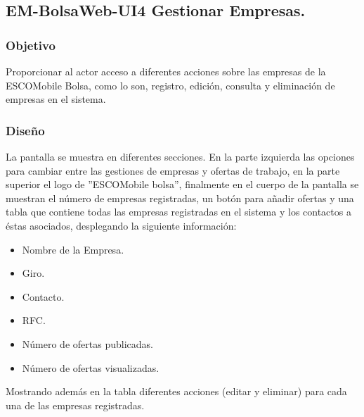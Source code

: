 					



\subsection{EM-BolsaWeb-UI4 Gestionar Empresas.}

\subsubsection{Objetivo}
	\noindent
	Proporcionar al actor acceso a diferentes acciones sobre las empresas de la ESCOMobile Bolsa, como lo son, registro, edición, consulta y eliminación de empresas en el sistema. 

\subsubsection{Diseño}
	\noindent
	La pantalla se muestra en diferentes secciones. En la parte izquierda las opciones para cambiar entre las gestiones de empresas y ofertas de trabajo, en la parte superior el logo de ''ESCOMobile bolsa'', finalmente en el cuerpo de la pantalla se muestran el número de empresas registradas, un botón para añadir ofertas y una tabla que contiene todas las empresas registradas en el sistema y los contactos a éstas asociados, desplegando la siguiente información:
	\begin{itemize}
		\item Nombre de la Empresa.
		\item Giro.
		\item Contacto.
		\item RFC.
		\item Número de ofertas publicadas.
		\item Número de ofertas visualizadas. 
	\end{itemize}
	Mostrando además en la tabla diferentes acciones (editar y eliminar) para cada una de las empresas registradas.

\pagebreak
{}

